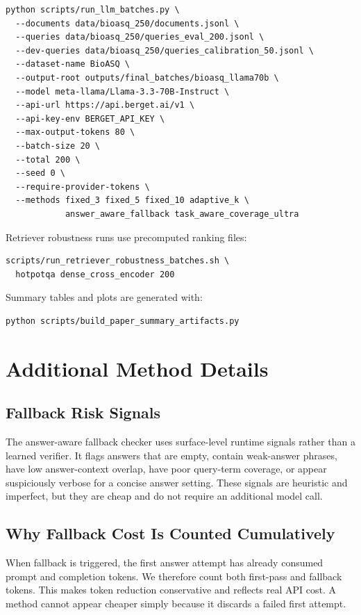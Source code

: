 \documentclass[11pt]{article}
\begin{document}
\begin{verbatim}
python scripts/run_llm_batches.py \
  --documents data/bioasq_250/documents.jsonl \
  --queries data/bioasq_250/queries_eval_200.jsonl \
  --dev-queries data/bioasq_250/queries_calibration_50.jsonl \
  --dataset-name BioASQ \
  --output-root outputs/final_batches/bioasq_llama70b \
  --model meta-llama/Llama-3.3-70B-Instruct \
  --api-url https://api.berget.ai/v1 \
  --api-key-env BERGET_API_KEY \
  --max-output-tokens 80 \
  --batch-size 20 \
  --total 200 \
  --seed 0 \
  --require-provider-tokens \
  --methods fixed_3 fixed_5 fixed_10 adaptive_k \
            answer_aware_fallback task_aware_coverage_ultra
\end{verbatim}

Retriever robustness runs use precomputed ranking files:

\begin{verbatim}
scripts/run_retriever_robustness_batches.sh \
  hotpotqa dense_cross_encoder 200
\end{verbatim}

Summary tables and plots are generated with:

\begin{verbatim}
python scripts/build_paper_summary_artifacts.py
\end{verbatim}

\section{Additional Method Details}

\subsection{Fallback Risk Signals}

The answer-aware fallback checker uses surface-level runtime signals rather than a learned verifier. It flags answers that are empty, contain weak-answer phrases, have low answer-context overlap, have poor query-term coverage, or appear suspiciously verbose for a concise answer setting. These signals are heuristic and imperfect, but they are cheap and do not require an additional model call.

\subsection{Why Fallback Cost Is Counted Cumulatively}

When fallback is triggered, the first answer attempt has already consumed prompt and completion tokens. We therefore count both first-pass and fallback tokens. This makes token reduction conservative and reflects real API cost. A method cannot appear cheaper simply because it discards a failed first attempt.
\end{document}
